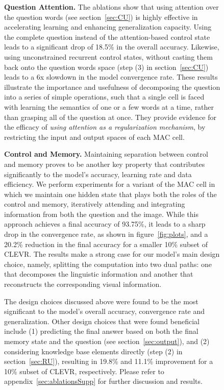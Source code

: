 \documentclass[fleqn]{article}
\newcommand{\figref}[1]{figure~\ref{fig:#1}}
\newcommand{\secref}[1]{section~\ref{sec:#1}}
\newcommand{\appref}[1]{appendix~\ref{sec:#1}}
\begin{document}
\begin{figure}[t]
\begin{minipage}{0.55\textwidth}
\textbf{Question Attention.} The ablations show that using attention over the question words (see \secref{CU}) is highly effective in accelerating learning and enhancing generalization capacity. Using the complete question  instead of the attention-based control state leads to a significant drop of 18.5\% in the overall accuracy. Likewise, using unconstrained recurrent control states, without casting them back onto the question words space (step (3) in \secref{CU}) leads to a 6x slowdown in the model convergence rate. These results illustrate the importance and usefulness of decomposing the question into a series of simple operations, such that a single cell is faced with learning the semantics of one or a few words at a time, rather than grasping all of the question at once. They provide evidence for the efficacy of \textit{using attention as a regularization mechanism}, by restricting the input and output spaces of each MAC cell.

\textbf{Control and Memory.} Maintaining separation between control and memory proves to be another key property that contributes significantly to the model's accuracy, learning rate and data efficiency. We perform experiments for a variant of the MAC cell in which we maintain one hidden state that plays both the roles of the control and memory, iteratively attending and integrating information from both the question and the image. While this approach achieves a final accuracy of 93.75\%, it leads to a sharp drop in the convergence rate, as shown in \figref{plots}, and a 20.2\% reduction in the final accuracy for a smaller 10\% subset of CLEVR. The results make a strong case for our model's main design choice, namely, splitting the computation into two dual paths: one that decomposes the linguistic information and another that reconstructs the corresponding visual information.

The design choices discussed above were found to be the most significant to the model's overall accuracy, convergence rate and generalization. Other design choices that were found  beneficial include (1) predicting the final answer based on both the final memory state and the question (see \secref{output}), and (2) considering knowledge base elements directly (step (2) in \secref{RU}), resulting in 19.8\%  and 11.1\% improvement for a 10\% subset of CLEVR, respectively. Please refer to \appref{ablationsSupp} for further discussion and results.
\label{sec:ablations}


\end{minipage}
\end{figure}
\end{document}
